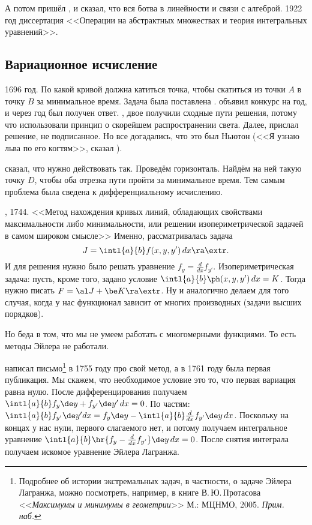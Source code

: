 \documentclass[a4paper,oneside,fleqn,10pt]{article}
\newcommand{\dx}{\,dx} \newcommand{\dy}{\,dy}
\begin{document}
А потом пришёл , и сказал, что вся ботва в линейности и
связи с алгеброй.  1922 год диссертация 
<<Операции на абстрактных множествах и теория интегральных
уравнений>>.

\subsection{Вариационное исчисление}

1696 год. По какой кривой должна катиться точка, чтобы скатиться из
точки $A$ в точку $B$ за минимальное время. Задача была поставлена
.   объявил
конкурс на год, и через год был получен ответ.  , двое
 получили сходные пути решения, потому что использовали
принцип  о скорейшем распространении света.  Далее,
 прислал решение, не подписанное. Но все догадались, что
это был Ньютон (<<Я узнаю льва по его когтям>>, сказал
).

 сказал, что нужно действовать так.  Проведём
горизонталь. Найдём на ней такую точку $D$, чтобы оба отрезка пути
пройти за минимальное время. Тем самым проблема была сведена к
дифференциальному исчислению.

, 1744. <<Метод нахождения кривых линий, обладающих
свойствами максимальности либо минимальности, или решении
изопериметрической задачей в самом широком смысле>> Именно,
рассматривалась задача
$$J = \intl{a}{b} f(x, y, y')\dx \ra \extr.$$ И для решения нужно было
решать уравнение $f_y = \frac{d}{dx} f_{y'}$.  Изопериметрическая
задача: пусть, кроме того, задано условие $\intl{a}{b} \ph(x,y,y')\dx
= K$. Тогда нужно писать $F = \al J + \be K \ra \extr$.  Ну и
аналогично делаем для того случая, когда у нас функционал зависит от
многих производных (задачи высших порядков).

Но беда в том, что мы не умеем работать с многомерными функциями.  То
есть методы Эйлера не работали.

 написал  письмо\footnote{Подробнее
  об истории экстремальных задач, в частности, о задаче Эйлера
  Лагранжа, можно посмотреть, например, в книге В.\,Ю.\,Протасова
  <<\emph{Максимумы и минимумы в геометрии}>> М.: МЦНМО,
  2005. \emph{Прим. наб.}}  в 1755 году про свой метод, а в 1761 году
была первая публикация. Мы скажем, что необходимое условие это то, что
первая вариация равна нулю. После дифференцирования получаем
$\intl{a}{b} f_y \de y + f_{y'} \de y'\dx = 0$.  По частям:
$\intl{a}{b} f_{y'} \de y'dx = f_y\de y - \intl{a}{b} \frac{d}{dx}
f_{y'}\de y \dx$.  Поскольку на концах у нас нули, первого слагаемого
нет, и потому получаем интегральное уравнение $\intl{a}{b} \hr{f_y -
  \frac{d}{dx} f_{y'} }\de y \dx = 0$.  После снятия интеграла
получаем искомое уравнение Эйлера Лагранжа.
\end{document}
